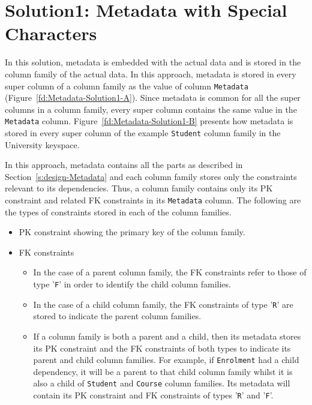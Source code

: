 
\section{Solution1:  Metadata with Special Characters} \label{s:design-sol1}

In this  solution,   metadata is embedded with the actual data and is
stored in the column family of the actual data.  In this approach,  metadata is
stored in every super column of a column family  as the value of column
\texttt{Metadata} (Figure~\ref{fd:Metadata-Solution1-A}).  Since metadata is
common for all the super columns in a column family,  every super column
contains the same  value in the \texttt{Metadata} column. 
Figure~\ref{fd:Metadata-Solution1-B} presents how metadata is stored in every
super column of the example \texttt{Student} column family in the University
keyspace. 
	

		
In this approach,  metadata contains all the parts as 
described in Section~\ref{s:design-Metadata} and each column family stores only
the constraints relevant to its dependencies.  Thus,  a column family contains
only its \ac{PK} constraint and related \ac{FK} constraints in its
\texttt{Metadata} column.  The following are the types of constraints stored in
each of the column families. 
	
		\begin{itemize}
		  \item  \ac{PK} constraint showing the primary key of the column family. 
		  \item \ac{FK} constraints 
				\begin{itemize}
					\item In the case of a parent column family, the \ac{FK} constraints refer
					to those of type '\texttt{F}' in order to identify the child column
					families.
					\item  In the case of a child column family, the \ac{FK} constraints of
					type '\texttt{R}' are stored to indicate the parent column families. 
					\item If a column family is both a parent and a child,  then its metadata
					stores its \ac{PK} constraint and the \ac{FK} constraints of both types to
					indicate its parent and child column families. For example, if
					\texttt{Enrolment} had a child dependency, it will be a parent to
					that child column family whilst it is also a child of \texttt{Student} and
					\texttt{Course} column families. Its metadata will contain its \ac{PK}
					constraint and \ac{FK} constraints of types '\texttt{R}' and '\texttt{F}'.
				\end{itemize}
		\end{itemize}
		

